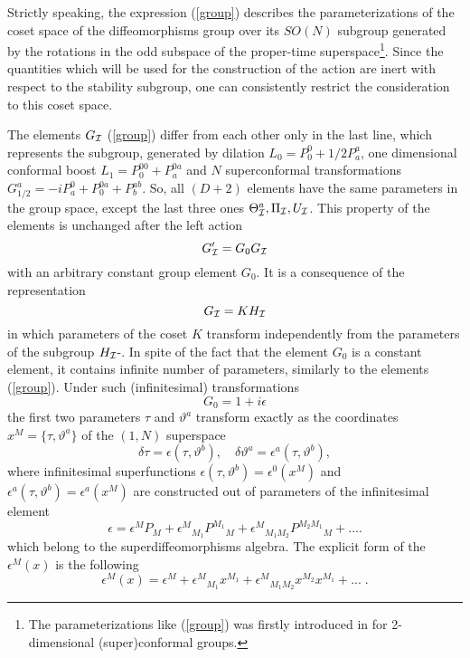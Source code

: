\documentclass[a4paper,twocolumn,showpacs,preprintnumbers,amsmath,amssymb]{revtex4}
\newcommand{\p}[1]{(\ref{#1})}
\begin{document}
Strictly speaking,
the expression (\ref{group}) describes
the parameterizations of the coset space of the diffeomorphisms
group over its $SO(N)$ subgroup generated by the rotations
in the odd subspace of the proper-time superspace\footnote{The parameterizations
like \p{group} was firstly introduced in \cite{IK1,IK2} for 2-dimensional
(super)conformal groups.}. Since the quantities
which will be used for the construction
of the action are inert with respect to the  stability subgroup,
one can consistently restrict the consideration to this coset space.

The elements $G_{\cal I}$ (\ref{group}) differ
from each other only in the last line, which represents
the subgroup, generated by dilation $L_0=P^0_0+1/2 P^a_a$,
one dimensional conformal
boost $L_1=P^{00}_0+ P^{0a}_a$ and $N$ superconformal
transformations $G_{1/2}^a=-i P^{0}_a+P^{0a}_0+P^{ab}_b$.
So, all $(D+2)$ elements have the same parameters in the group space,
except the last three
ones $ \Theta_{\cal I}^a, \Pi_{\cal I}, U_{\cal I}$.
This property of the elements is unchanged after the left action
\begin{equation}\label{left}
G'_{\cal I}=G_0 G_{\cal I}
\end{equation}
 with  an arbitrary constant group element $G_0$. It is a consequence of the
 representation
 \begin{equation}\label{kh}
G_{\cal I}=K H_{\cal I}
\end{equation}
in which parameters of the coset $K$ transform independently from the
parameters of the subgroup $H_{\cal I}$\cite{CWZ}-\cite{PK}.
In spite of the fact that the element $G_0$ is a constant element, it contains
infinite number of parameters, similarly to the elements (\ref{group}).
Under such (infinitesimal) transformations
\begin{equation}\label{inf}
G_0=1+i\epsilon
\end{equation}
the first
two parameters $\tau$ and
$\vartheta^a$ transform exactly
as the coordinates $x^M=\{\tau,\vartheta^a\}$ of the $(1,N)$  su\-per\-space\cite{P_0}
\begin{equation}\label{trans}
\delta \tau = \epsilon(\tau,\vartheta^b),\quad
\delta \vartheta^a = \epsilon^a(\tau,\vartheta^b),
\end{equation}
where infinitesimal superfunctions $\epsilon(\tau,\vartheta^b)=\epsilon^0(x^M)$ and
$\epsilon^a(\tau,\vartheta^b)=\epsilon^a(x^M)$ are constructed out of parameters
of the infinitesimal  element
\begin{equation}
\epsilon =\epsilon^M P_M+{\epsilon^{M}}_{M_1}{P^{M_1}}_M+
{\epsilon^{M}}_{M_1M_2}{P^{M_2M_1}}_M+... .
\end{equation}
 which belong to the
superdiffeomorphisms algebra. The explicit form of the $\epsilon^M(x)$
is the following
\begin{equation}
\epsilon^M(x)=\epsilon^M+{\epsilon^M}_{M_1}x^{M_1}+
{\epsilon^M}_{M_1M_2}x^{M_2}x^{M_1}+...\;.
\end{equation}
\end{document}
